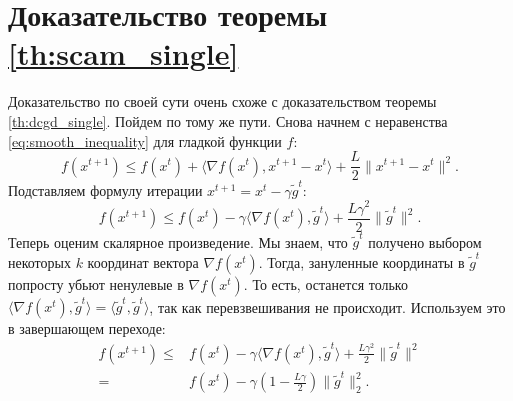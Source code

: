 \section{Доказательство теоремы \ref{th:scam_single}} \label{app:scam_single_proof}
    Доказательство по своей сути очень схоже с доказательством теоремы \ref{th:dcgd_single}. Пойдем по тому же пути. Снова начнем с неравенства \eqref{eq:smooth_inequality} для гладкой функции $f$:
    \begin{equation*}
        f(x^{t + 1}) \leq f(x^t) + \langle \nabla f(x^t), x^{t + 1} - x^t \rangle + \frac{L}{2} \|x^{t + 1} - x^t\|^2.
    \end{equation*}
    Подставляем формулу итерации $x^{t + 1} = x^t - \gamma \tilde{g}^t$:
    \begin{equation*}
        f(x^{t + 1}) \leq f(x^t) - \gamma \langle \nabla f(x^t), \tilde{g}^t \rangle + \frac{L \gamma^2}{2} \|\tilde{g}^t\|^2.
    \end{equation*}
    Теперь оценим скалярное произведение. Мы знаем, что $\tilde{g}^t$ получено выбором некоторых $k$ координат вектора $\nabla f(x^t)$. Тогда, зануленные координаты в $\tilde{g}^t$ попросту убьют ненулевые в $\nabla f(x^t)$. То есть, останется только $\langle \nabla f(x^t), \tilde{g}^t \rangle = \langle \tilde{g}^t, \tilde{g}^t \rangle$, так как перевзвешивания не происходит. Используем это в завершающем переходе:
    \begin{align*}
        f(x^{t + 1}) \leq& f(x^t) - \gamma \langle \nabla f(x^t), \tilde{g}^t \rangle + \frac{L \gamma^2}{2} \|\tilde{g}^t\|^2 \\
        =& f(x^t) - \gamma \left(1 - \frac{L \gamma}{2}\right) \|\tilde{g}^t\|_2^2.
    \end{align*}
